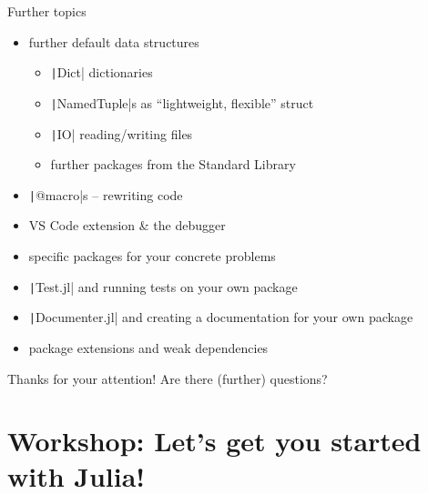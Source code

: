 \documentclass[aspectratio=169, 12pt]{beamer}
\begin{document}
    \begin{frame}{Further topics}
        \begin{itemize}
            \item further default data structures
            \begin{itemize}
                \item \texttt|Dict| dictionaries
                \item \texttt|NamedTuple|s as “lightweight, flexible” struct
                \item \texttt|IO| reading/writing files
                \item further packages from the Standard Library
            \end{itemize}
            \item \texttt|@macro|s – rewriting code
            \item VS Code extension \& the debugger
            \item specific packages for your concrete problems
            \item \texttt|Test.jl| and running tests on your own package
            \item \texttt|Documenter.jl| and creating a documentation for your own package
            \item \alert{package extensions} and weak dependencies
        \end{itemize}
    \end{frame}
    \begin{frame}{Thanks for your attention!}
        Are there (further) questions?
    \end{frame}
    \section{Workshop: Let's get you started with Julia!}
\end{document}
